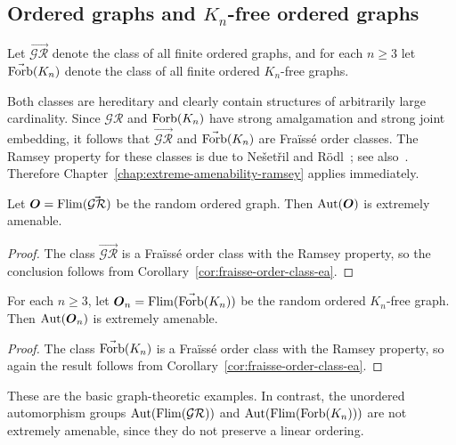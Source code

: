 \subsection[Ordered graphs and \texorpdfstring{\(K_n\)}{K sub n}-free ordered graphs]{Ordered graphs and \(K_n\)-free ordered graphs}

Let \(\vec{\mathcal{GR}}\) denote the class of all finite ordered graphs, and for each \(n\geq 3\) let \(\vec{\operatorname{Forb}}(K_n)\) denote the class of all finite ordered \(K_n\)-free graphs.

Both classes are hereditary and clearly contain structures of arbitrarily large cardinality. Since \(\mathcal{GR}\) and \(\operatorname{Forb}(K_n)\) have strong amalgamation and strong joint embedding, it follows that \(\vec{\mathcal{GR}}\) and \(\vec{\operatorname{Forb}}(K_n)\) are Fraïssé order classes. The Ramsey property for these classes is due to Ne\v{s}et\v{r}il and R\"odl~\cite{NR77,NR83}; see also~\cite{N89}. Therefore Chapter~\ref{chap:extreme-amenability-ramsey} applies immediately.

\begin{theorem}
    \label{thm:random-ordered-graph-ea}
    Let \(\boldsymbol{O}=\operatorname{Flim}(\vec{\mathcal{GR}})\) be the random ordered graph. Then \(\operatorname{Aut}(\boldsymbol{O})\) is extremely amenable.
\end{theorem}

\begin{proof}
    The class \(\vec{\mathcal{GR}}\) is a Fraïssé order class with the Ramsey property, so the conclusion follows from Corollary~\ref{cor:fraisse-order-class-ea}.
\end{proof}

\begin{theorem}
    \label{thm:kn-free-ordered-graph-ea}
    For each \(n\geq 3\), let \(\boldsymbol{O}_n=\operatorname{Flim}(\vec{\operatorname{Forb}}(K_n))\) be the random ordered \(K_n\)-free graph. Then \(\operatorname{Aut}(\boldsymbol{O}_n)\) is extremely amenable.
\end{theorem}

\begin{proof}
    The class \(\vec{\operatorname{Forb}}(K_n)\) is a Fraïssé order class with the Ramsey property, so again the result follows from Corollary~\ref{cor:fraisse-order-class-ea}.
\end{proof}

These are the basic graph-theoretic examples. In contrast, the unordered automorphism groups \(\operatorname{Aut}(\operatorname{Flim}(\mathcal{GR}))\) and \(\operatorname{Aut}(\operatorname{Flim}(\operatorname{Forb}(K_n)))\) are not extremely amenable, since they do not preserve a linear ordering.


